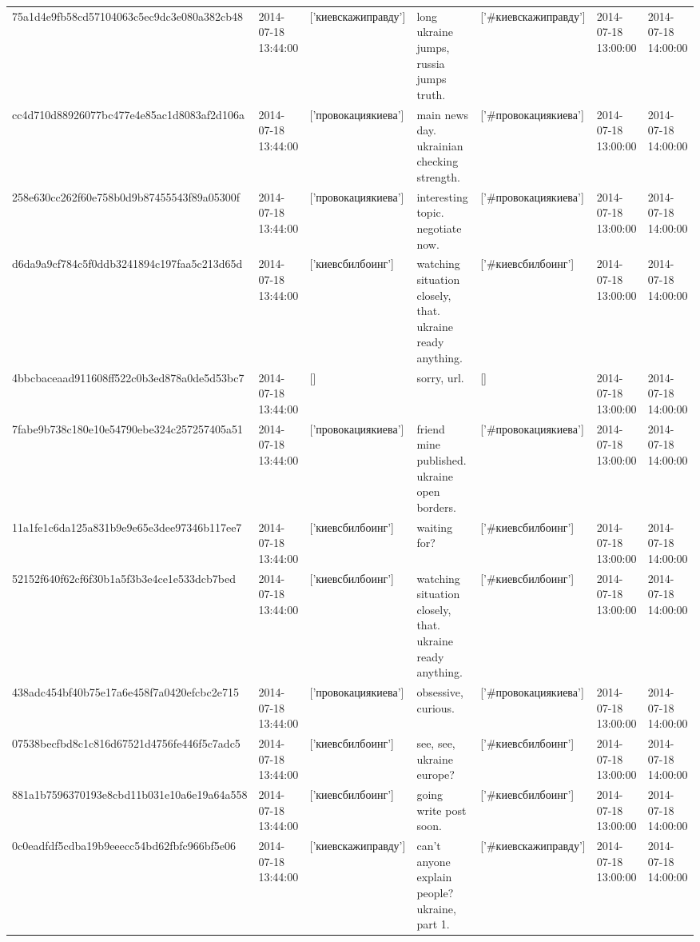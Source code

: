 \begin{tabular}{lllllll}
75a1d4e9fb58cd57104063c5ec9dc3e080a382cb48 & 2014-07-18 13:44:00 & ['киевскажиправду'] & long ukraine jumps, russia jumps truth. & ['#киевскажиправду'] & 2014-07-18 13:00:00 & 2014-07-18 14:00:00 \\
cc4d710d88926077bc477e4e85ac1d8083af2d106a & 2014-07-18 13:44:00 & ['провокациякиева'] & main news day. ukrainian checking strength. & ['#провокациякиева'] & 2014-07-18 13:00:00 & 2014-07-18 14:00:00 \\
258e630cc262f60e758b0d9b87455543f89a05300f & 2014-07-18 13:44:00 & ['провокациякиева'] & interesting topic. negotiate now. & ['#провокациякиева'] & 2014-07-18 13:00:00 & 2014-07-18 14:00:00 \\
d6da9a9cf784c5f0ddb3241894c197faa5c213d65d & 2014-07-18 13:44:00 & ['киевсбилбоинг'] & watching situation closely, that. ukraine ready anything. & ['#киевсбилбоинг'] & 2014-07-18 13:00:00 & 2014-07-18 14:00:00 \\
4bbcbaceaad911608ff522c0b3ed878a0de5d53bc7 & 2014-07-18 13:44:00 & [] & sorry, url. & [] & 2014-07-18 13:00:00 & 2014-07-18 14:00:00 \\
7fabe9b738c180e10e54790ebe324c257257405a51 & 2014-07-18 13:44:00 & ['провокациякиева'] & friend mine published. ukraine open borders. & ['#провокациякиева'] & 2014-07-18 13:00:00 & 2014-07-18 14:00:00 \\
11a1fe1c6da125a831b9e9e65e3dee97346b117ee7 & 2014-07-18 13:44:00 & ['киевсбилбоинг'] & waiting for? & ['#киевсбилбоинг'] & 2014-07-18 13:00:00 & 2014-07-18 14:00:00 \\
52152f640f62cf6f30b1a5f3b3e4ce1e533dcb7bed & 2014-07-18 13:44:00 & ['киевсбилбоинг'] & watching situation closely, that. ukraine ready anything. & ['#киевсбилбоинг'] & 2014-07-18 13:00:00 & 2014-07-18 14:00:00 \\
438adc454bf40b75e17a6e458f7a0420efcbc2e715 & 2014-07-18 13:44:00 & ['провокациякиева'] & obsessive, curious. & ['#провокациякиева'] & 2014-07-18 13:00:00 & 2014-07-18 14:00:00 \\
07538becfbd8c1c816d67521d4756fe446f5c7adc5 & 2014-07-18 13:44:00 & ['киевсбилбоинг'] & see, see, ukraine europe? & ['#киевсбилбоинг'] & 2014-07-18 13:00:00 & 2014-07-18 14:00:00 \\
881a1b7596370193e8cbd11b031e10a6e19a64a558 & 2014-07-18 13:44:00 & ['киевсбилбоинг'] & going write post soon. & ['#киевсбилбоинг'] & 2014-07-18 13:00:00 & 2014-07-18 14:00:00 \\
0c0eadfdf5cdba19b9eeecc54bd62fbfc966bf5e06 & 2014-07-18 13:44:00 & ['киевскажиправду'] & can't anyone explain people? ukraine, part 1. & ['#киевскажиправду'] & 2014-07-18 13:00:00 & 2014-07-18 14:00:00 \\

\end{tabular}

